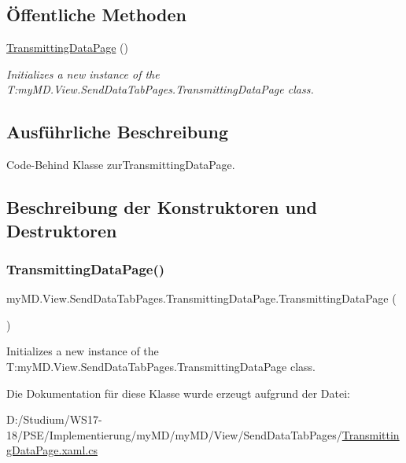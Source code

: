 \subsection*{Öffentliche Methoden}
\begin{DoxyCompactItemize}
\item 
\mbox{\hyperlink{classmy_m_d_1_1_view_1_1_send_data_tab_pages_1_1_transmitting_data_page_ac1fa89a1f86e8f1b72e0a07ab569a525}{Transmitting\+Data\+Page}} ()
\begin{DoxyCompactList}\small\item\em Initializes a new instance of the T\+:my\+M\+D.\+View.\+Send\+Data\+Tab\+Pages.\+Transmitting\+Data\+Page class. \end{DoxyCompactList}\end{DoxyCompactItemize}


\subsection{Ausführliche Beschreibung}
Code-\/\+Behind Klasse zur\+Transmitting\+Data\+Page. 



\subsection{Beschreibung der Konstruktoren und Destruktoren}
\mbox{\label{classmy_m_d_1_1_view_1_1_send_data_tab_pages_1_1_transmitting_data_page_ac1fa89a1f86e8f1b72e0a07ab569a525}} 
\subsubsection{\texorpdfstring{Transmitting\+Data\+Page()}{TransmittingDataPage()}}
{\footnotesize\ttfamily my\+M\+D.\+View.\+Send\+Data\+Tab\+Pages.\+Transmitting\+Data\+Page.\+Transmitting\+Data\+Page (\begin{DoxyParamCaption}{ }\end{DoxyParamCaption})}



Initializes a new instance of the T\+:my\+M\+D.\+View.\+Send\+Data\+Tab\+Pages.\+Transmitting\+Data\+Page class. 



Die Dokumentation für diese Klasse wurde erzeugt aufgrund der Datei\+:\begin{DoxyCompactItemize}
\item 
D\+:/\+Studium/\+W\+S17-\/18/\+P\+S\+E/\+Implementierung/my\+M\+D/my\+M\+D/\+View/\+Send\+Data\+Tab\+Pages/\mbox{\hyperlink{_transmitting_data_page_8xaml_8cs}{Transmitting\+Data\+Page.\+xaml.\+cs}}\end{DoxyCompactItemize}
